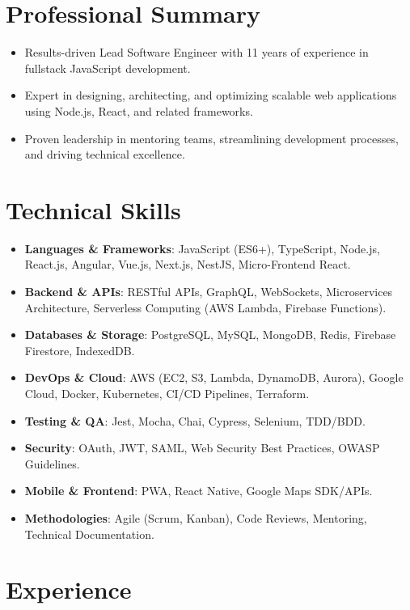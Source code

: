 \documentclass[10pt,a4paper]{article}
\begin{document}
\thispagestyle{fancy}  %

\section*{Professional Summary}
\begin{itemize}[leftmargin=*]
  \item Results-driven Lead Software Engineer with 11 years of experience in fullstack JavaScript development.
  \item Expert in designing, architecting, and optimizing scalable web applications using Node.js, React, and related frameworks.
  \item Proven leadership in mentoring teams, streamlining development processes, and driving technical excellence.
\end{itemize}

\section*{Technical Skills}
\begin{itemize}[leftmargin=*]
  \item \textbf{Languages \& Frameworks}: JavaScript (ES6+), TypeScript, Node.js, React.js, Angular, Vue.js, Next.js, NestJS, Micro-Frontend React.
  \item \textbf{Backend \& APIs}: RESTful APIs, GraphQL, WebSockets, Microservices Architecture, Serverless Computing (AWS Lambda, Firebase Functions).
  \item \textbf{Databases \& Storage}: PostgreSQL, MySQL, MongoDB, Redis, Firebase Firestore, IndexedDB.
  \item \textbf{DevOps \& Cloud}: AWS (EC2, S3, Lambda, DynamoDB, Aurora), Google Cloud, Docker, Kubernetes, CI/CD Pipelines, Terraform.
  \item \textbf{Testing \& QA}: Jest, Mocha, Chai, Cypress, Selenium, TDD/BDD.
  \item \textbf{Security}: OAuth, JWT, SAML, Web Security Best Practices, OWASP Guidelines.
  \item \textbf{Mobile \& Frontend}: PWA, React Native, Google Maps SDK/APIs.
  \item \textbf{Methodologies}: Agile (Scrum, Kanban), Code Reviews, Mentoring, Technical Documentation.
\end{itemize}

\section*{Experience}
\end{document}
